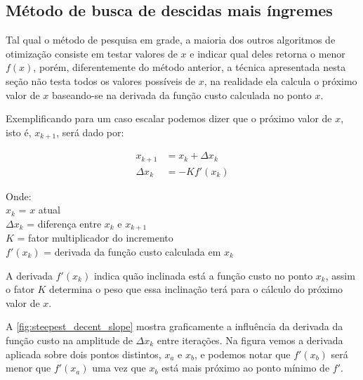 \subsection{Método de busca de descidas mais íngremes}
\label{subsec:metodo_descida_mais_ingreme}

Tal qual o método de pesquisa em grade, a maioria dos outros algoritmos de otimização
consiste em testar valores de $x$ e indicar qual deles retorna o menor $f(x)$,
porém, diferentemente do método anterior, a técnica apresentada nesta seção não testa
todos os valores possíveis de $x$, na realidade ela calcula o próximo valor de $x$ baseando-se
na derivada da função custo calculada no ponto $x$.

Exemplificando para um caso escalar podemos dizer que o próximo valor de $x$, isto é, $x_{k+1}$, será dado por:

\begin{subequations}
	\begin{align}
		x_{k+1} &= x_k + \Delta x_k		\label{eq:steepest_decent_xk1_a} \\ 
		\Delta x_k &= -K f'(x_k)		\label{eq:steepest_decent_xk1_b}
	\end{align}
\end{subequations}

\noindent
Onde: \\
$x_k$ = $x$ atual \\
$\Delta x_k$ = diferença entre $x_k$ e $x_{k+1}$ \\
$K$ = fator multiplicador do incremento \\
$f'(x_k)$ = derivada da função custo calculada em $x_k$
\newline

A derivada $f'(x_k)$ indica quão inclinada está a função custo no ponto $x_k$,
assim o fator $K$ determina o peso que essa inclinação terá para o cálculo do
próximo valor de $x$.

A \cref{fig:steepest_decent_slope} mostra graficamente a influência da derivada
da função custo na amplitude de $\Delta x_k$ entre iterações. Na figura vemos
a derivada aplicada sobre dois pontos distintos, $x_a$ e $x_b$, e podemos notar
que $f'(x_b)$ será menor que $f'(x_a)$ uma vez que $x_b$ está mais próximo ao 
ponto mínimo de $f'$.

